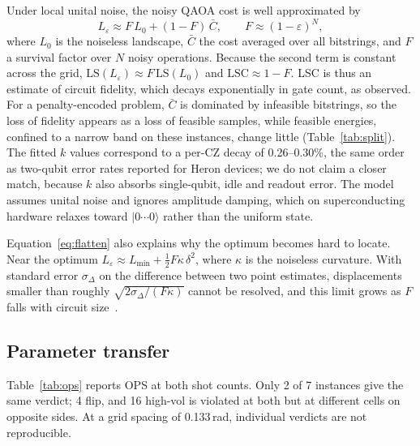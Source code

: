 \documentclass[conference]{IEEEtran}
\newcommand{\LS}{\mathrm{LS}}
\newcommand{\LSC}{\mathrm{LSC}}
\begin{document}
Under local unital noise, the noisy QAOA cost is well approximated
by~\cite{xue2019effects, marshall2020characterizing}
\begin{equation}
  L_\varepsilon \approx F\, L_0 + (1-F)\, \bar{C},
  \qquad F \approx (1-\varepsilon)^{N},
  \label{eq:flatten}
\end{equation}
where $L_0$ is the noiseless landscape, $\bar{C}$ the cost averaged over
all bitstrings, and $F$ a survival factor over $N$ noisy operations.
Because the second term is constant across the grid,
$\LS(L_\varepsilon) \approx F\,\LS(L_0)$ and $\LSC \approx 1-F$. LSC is
thus an estimate of circuit fidelity, which decays exponentially in gate
count, as observed. For a penalty-encoded problem, $\bar{C}$ is dominated
by infeasible bitstrings, so the loss of fidelity appears as a loss of
feasible samples, while feasible energies, confined to a narrow band on
these instances, change little (Table~\ref{tab:split}). The fitted $k$ values correspond to a per-CZ
decay of 0.26--0.30\%, the same order as two-qubit error rates reported
for Heron devices; we do not claim a closer match, because $k$ also
absorbs single-qubit, idle and readout error. The model assumes unital
noise and ignores amplitude damping, which on superconducting hardware
relaxes toward $|0\cdots0\rangle$ rather than the uniform state.

Equation~\eqref{eq:flatten} also explains why the optimum becomes hard
to locate. Near the optimum $L_\varepsilon \approx L_\mathrm{min} +
\tfrac12 F\kappa\,\delta^2$, where $\kappa$ is the noiseless curvature.
With standard error $\sigma_\Delta$ on the difference between two
point estimates, displacements smaller than roughly
$\sqrt{2\sigma_\Delta/(F\kappa)}$ cannot be resolved, and this limit
grows as $F$ falls with circuit size~\cite{wang2021noise}.

\subsection{Parameter transfer}
\label{sec:ops}

Table~\ref{tab:ops} reports OPS at both shot counts. Only 2 of 7
instances give the same verdict; 4 flip, and 16 high-vol is violated at
both but at different cells on opposite sides. At a grid spacing of
0.133\,rad, individual verdicts are not reproducible.
\end{document}
